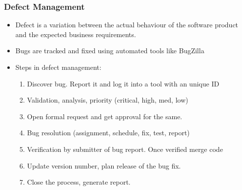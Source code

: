 \documentclass{article}
\begin{document}
\subsubsection{Defect Management}
\begin{itemize}
    \item Defect is a variation between the actual behaviour of the software product and the expected business requirements. 
    
    \item Bugs are tracked and fixed using automated tools like BugZilla
    
    \item Steps in defect management:
    \begin{enumerate}
        \item Discover bug. Report it and log it into a tool with an unique ID
        
        \item Validation, analysis, priority (critical, high, med, low)
        
        \item Open formal request and get approval for the same. 
        
        \item Bug resolution (assignment, schedule, fix, test, report)
        
        \item Verification by submitter of bug report. Once verified merge code
        
        \item Update version number, plan release of the bug fix.
        
        \item Close the process, generate report. 
    \end{enumerate}
\end{itemize}
\end{document}
